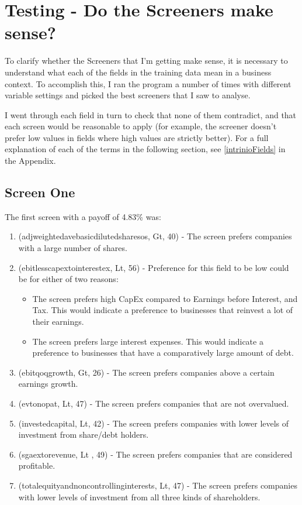 \section{Testing - Do the Screeners make sense?}
To clarify whether the Screeners that I'm getting make sense, it is necessary to understand what each of the fields in the training data mean in a business context. To accomplish this, I ran the program a number of times with different variable settings and picked the best screeners that I saw to analyse. \newline

I went through each field in turn to check that none of them contradict, and that each screen would be reasonable to apply (for example, the screener doesn't prefer low values in fields where high values are strictly better). For a full explanation of each of the terms in the following section, see \ref{intrinioFields} in the Appendix.

\subsection{Screen One}
The first screen with a payoff of 4.83\% was:
\begin{enumerate}
    \item (adjweightedavebasicdilutedsharesos, Gt, 40) - The screen prefers companies with a large number of shares.
    \item (ebitlesscapextointerestex, Lt, 56) - Preference for this field to be low could be for either of two reasons:
    \begin{itemize}
        \item The screen prefers high CapEx compared to Earnings before Interest, and Tax. This would indicate a preference to businesses that reinvest a lot of their earnings.
        \item The screen prefers large interest expenses. This would indicate a preference to businesses that have a comparatively large amount of debt.
    \end{itemize}
    \item (ebitqoqgrowth, Gt, 26) - The screen prefers companies above a certain earnings growth.
    \item (evtonopat, Lt, 47) - The screen prefers companies that are not overvalued.
    \item (investedcapital, Lt, 42) - The screen prefers companies with lower levels of investment from share/debt holders.
    \item (sgaextorevenue, Lt , 49) - The screen prefers companies that are considered profitable.
    \item (totalequityandnoncontrollinginterests, Lt, 47) - The screen prefers companies with lower levels of investment from all three kinds of shareholders.
\end{enumerate}

